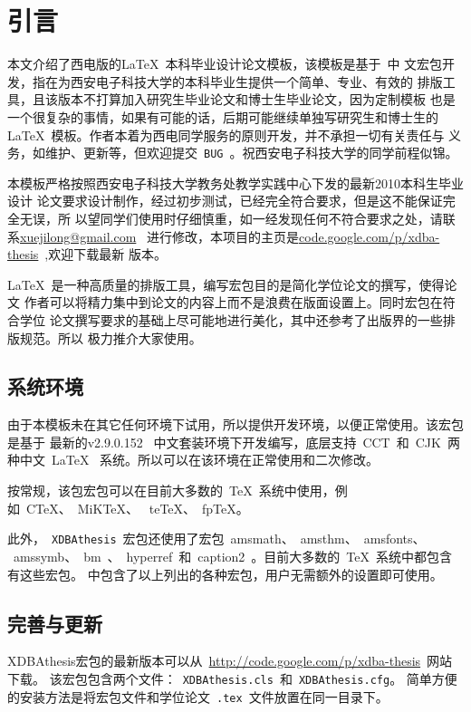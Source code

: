
\chapter{引言}
\label{chap:introduction}

本文介绍了西电版的\LaTeX{}~本科毕业设计论文模板，该模板是基于\CTeX{}~中
文宏包开发，指在为西安电子科技大学的本科毕业生提供一个简单、专业、有效的
排版工具，且该版本不打算加入研究生毕业论文和博士生毕业论文，因为定制模板
也是一个很复杂的事情，如果有可能的话，后期可能继续单独写研究生和博士生的
\LaTeX{}~模板。作者本着为西电同学服务的原则开发，并不承担一切有关责任与
义务，如维护、更新等，但欢迎提交~\texttt{BUG}~。祝西安电子科技大学的同学前程似锦。

本模板严格按照西安电子科技大学教务处教学实践中心下发的最新2010本科生毕业设计
论文要求设计制作，经过初步测试，已经完全符合要求，但是这不能保证完全无误，所
以望同学们使用时仔细慎重，如一经发现任何不符合要求之处，请联系\href{mailto:xuejilong@gmail.com}{xuejilong@gmail.com}
~进行修改，本项目的主页是\href{code.google.com/p/xdba-thesis}{code.google.com/p/xdba-thesis}~,欢迎下载最新
 版本。

\LaTeX{}~是一种高质量的排版工具，编写宏包目的是简化学位论文的撰写，使得论文
作者可以将精力集中到论文的内容上而不是浪费在版面设置上。同时宏包在符合学位
论文撰写要求的基础上尽可能地进行美化，其中还参考了出版界的一些排版规范。所以
极力推介大家使用。

\section{系统环境}
由于本模板未在其它任何环境下试用，所以提供开发环境，以便正常使用。该宏包是基于
最新的\CTeX v2.9.0.152~ 中文套装\cite{site:ctex}环境下开发编写，底层支持~CCT~和~CJK~两种中文~\LaTeX{}~
系统。所以可以在该环境在正常使用和二次修改。

按常规，该包宏包可以在目前大多数的~\TeX{}~系统中使用，例如~C\TeX{}、~MiK\TeX{}、
~te\TeX{}、~fp\TeX{}。

此外，~\texttt{XDBAthesis}~宏包还使用了宏包~amsmath、~amsthm、~amsfonts、
~amssymb、~bm~、~hyperref~和~caption2~。目前大多数的~\TeX{}~系统中都包含有这些宏包。
中包含了以上列出的各种宏包，用户无需额外的设置即可使用。

\section{完善与更新}

XDBAthesis宏包的最新版本可以从~\url{http://code.google.com/p/xdba-thesis}~网站下载。
该宏包包含两个文件：~\texttt{XDBAthesis.cls}~和~\texttt{XDBAthesis.cfg}。
简单方便的安装方法是将宏包文件和学位论文~\texttt{.tex}~文件放置在同一目录下。

